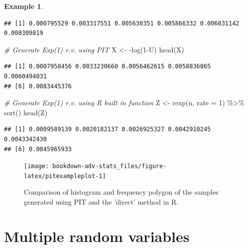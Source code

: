 \documentclass[
]{book}
\newenvironment{Shaded}{\begin{snugshade}}{\end{snugshade}}
\newcommand{\AttributeTok}[1]{\textcolor[rgb]{0.77,0.63,0.00}{#1}}
\newcommand{\CommentTok}[1]{\textcolor[rgb]{0.56,0.35,0.01}{\textit{#1}}}
\newcommand{\DecValTok}[1]{\textcolor[rgb]{0.00,0.00,0.81}{#1}}
\newcommand{\FunctionTok}[1]{\textcolor[rgb]{0.00,0.00,0.00}{#1}}
\newcommand{\NormalTok}[1]{#1}
\newcommand{\OtherTok}[1]{\textcolor[rgb]{0.56,0.35,0.01}{#1}}
\newcommand{\SpecialCharTok}[1]{\textcolor[rgb]{0.00,0.00,0.00}{#1}}
\theoremstyle{definition}
\theoremstyle{definition}
\newtheorem{example}{Example}[chapter]
\theoremstyle{definition}
\theoremstyle{definition}
\theoremstyle{remark}
\begin{document}
\begin{example}
\begin{verbatim}
## [1] 0.000795529 0.003317551 0.005630351 0.005866332 0.006031142 0.008309819
\end{verbatim}

\begin{Shaded}
\begin{Highlighting}[]
\CommentTok{\# Generate Exp(1) r.v. using PIT}
\NormalTok{X }\OtherTok{\textless{}{-}} \SpecialCharTok{{-}}\FunctionTok{log}\NormalTok{(}\DecValTok{1}\SpecialCharTok{{-}}\NormalTok{U)}
\FunctionTok{head}\NormalTok{(X)}
\end{Highlighting}
\end{Shaded}

\begin{verbatim}
## [1] 0.0007958456 0.0033230660 0.0056462615 0.0058836065 0.0060494031
## [6] 0.0083445376
\end{verbatim}

\begin{Shaded}
\begin{Highlighting}[]
\CommentTok{\# Generate Exp(1) r.v. using R built in function}
\NormalTok{Z }\OtherTok{\textless{}{-}} \FunctionTok{rexp}\NormalTok{(n, }\AttributeTok{rate =} \DecValTok{1}\NormalTok{) }\SpecialCharTok{\%\textgreater{}\%} \FunctionTok{sort}\NormalTok{()}
\FunctionTok{head}\NormalTok{(Z)}
\end{Highlighting}
\end{Shaded}

\begin{verbatim}
## [1] 0.0009589139 0.0020182137 0.0026925327 0.0042910245 0.0043342430
## [6] 0.0045965933
\end{verbatim}

\begin{figure}

{\centering \texttt{[image: bookdown-adv-stats\_files/figure-latex/pitexampleplot-1]} 

}

\caption{Comparison of histogram and frequency polygon of the samples generated using PIT and the 'direct' method in R.}\label{fig:pitexampleplot}
\end{figure}

\end{example}

\hypertarget{multiple-random-variables}{%
\section{Multiple random variables}\label{multiple-random-variables}}
\end{document}
